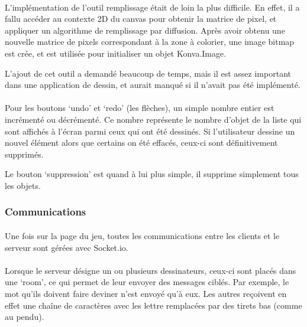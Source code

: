 \documentclass[11pt,a4paper]{article}
\begin{document}
                \paragraph{}
                L'implémentation de l'outil remplissage était de loin la plus difficile.
                En effet, il a fallu accéder au contexte 2D du canvas pour obtenir la matrice de pixel,
                et appliquer un algorithme de remplissage par diffusion.
                Après avoir obtenu une nouvelle matrice de pixels correspondant à la zone à colorier,
                une image bitmap est crée, et est utilisée pour initialiser un objet Konva.Image.

                L'ajout de cet outil a demandé beaucoup de temps,
                mais il est assez important dans une application de dessin,
                et aurait manqué si il n'avait pas été implémenté.
                \paragraph{}
                Pour les boutons `undo' et `redo' (les flèches), un simple nombre entier est incrémenté ou décrémenté.
                Ce nombre représente le nombre d'objet de la liste qui sont affichés à l'écran parmi ceux qui ont été dessinés.
                Si l'utilisateur dessine un nouvel élément alors que certains on été effacés,
                ceux-ci sont définitivement supprimés.

                Le bouton `suppression' est quand à lui plus simple, il supprime simplement tous les objets.
            \subsubsection{Communications}
                \paragraph{}
                Une fois sur la page du jeu, toutes les communications entre les clients et le serveur sont gérées avec Socket.io.
                \paragraph{}
                Lorsque le serveur désigne un ou plusieurs dessinateurs, ceux-ci sont placés dans une `room',
                ce qui permet de leur envoyer des messages ciblés.
                Par exemple, le mot qu'ils doivent faire deviner n'est envoyé qu'à eux.
                Les autres reçoivent en effet une chaîne de caractères avec les lettre remplacées par des tirets bas (comme au pendu).
\end{document}
